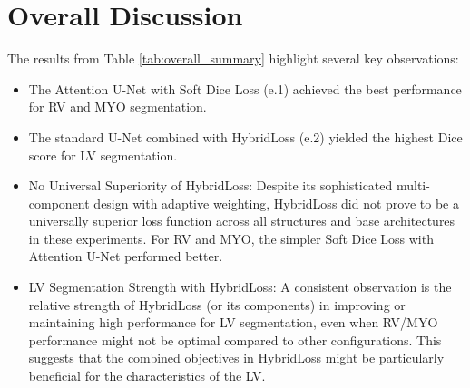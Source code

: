 \documentclass{article}
\begin{document}
\section{Overall Discussion}
The results from Table \ref{tab:overall_summary} highlight several key observations:
\begin{itemize}
  \item The Attention U-Net with Soft Dice Loss (e.1) achieved the best performance for RV and MYO segmentation.
  \item The standard U-Net combined with HybridLoss (e.2) yielded the highest Dice score for LV segmentation.
  \item No Universal Superiority of HybridLoss: Despite its sophisticated multi-component design with adaptive weighting, HybridLoss did not prove to be a universally superior loss function across all structures and base architectures in these experiments. For RV and MYO, the simpler Soft Dice Loss with Attention U-Net performed better.
  \item LV Segmentation Strength with HybridLoss: A consistent observation is the relative strength of HybridLoss (or its components) in improving or maintaining high performance for LV segmentation, even when RV/MYO performance might not be optimal compared to other configurations. This suggests that the combined objectives in HybridLoss might be particularly beneficial for the characteristics of the LV.
\end{itemize}
\end{document}
